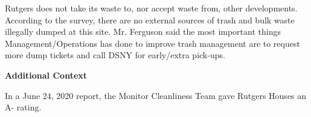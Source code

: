 Rutgers does not take its waste to, nor accept waste from, other developments. According to the survey, there are no external sources of trash and bulk waste illegally dumped at this site. Mr. Ferguson said the most important things Management/Operations has done to improve trash management are to request more dump tickets and call DSNY for early/extra pick-ups.

\textbf{Additional Context}  

In a June 24, 2020 report, the Monitor Cleanliness Team gave Rutgers Houses an A- rating.  